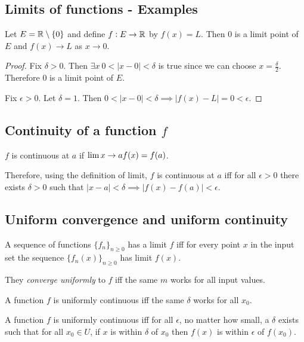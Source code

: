 \subsection{Limits of functions - Examples}

\begin{example}
  Let $E = \mathbb{R}\setminus \{0\}$ and define $f:E \to \mathbb{R}$ by $f(x) = L$. Then 0 is a limit point of
  $E$ and $f(x) \to L$ as $x \to 0$.
\end{example}

\begin{proof}
  Fix $\delta > 0$. Then $\exists x ~ 0 < |x - 0| < \delta$ is true since we can choose
  $x = \frac{\delta}{2}$. Therefore 0 is a limit point of $E$.

  Fix $\epsilon > 0$. Let $\delta = 1$. Then
  $0 < |x - 0| < \delta \implies |f(x) - L| = 0 < \epsilon$.
\end{proof}

\subsection{Continuity of a function $f$}

\begin{definition*}
$f$ is continuous at $a$ if $\LimEq{f(x)}{f(a)}{x}{a}$.
\end{definition*}

Therefore, using the definition of limit, $f$ is continuous at $a$ iff for all $\epsilon > 0$
there exists $\delta > 0$ such that $|x - a| < \delta \implies |f(x) - f(a)| < \epsilon$.

\subsection{Uniform convergence and uniform continuity}

\begin{definition*}
A sequence of functions $\{f_n\}_{n\geq 0}$ has a limit $f$ iff for every point
$x$ in the input set the sequence $\{f_n(x)\}_{n\geq 0}$ has limit $f(x)$.

They \textit{converge uniformly} to $f$ iff the same $m$ works for all input
values.
\end{definition*}

\begin{definition*}
A function $f$ is uniformly continuous iff the same $\delta$ works for all $x_0$.

A function $f$ is uniformly continuous iff for all $\epsilon$, no matter how
small, a $\delta$ exists such that for all $x_0 \in U$, if $x$ is within
$\delta$ of $x_0$ then $f(x)$ is within $\epsilon$ of $f(x_0)$.
\end{definition*}


